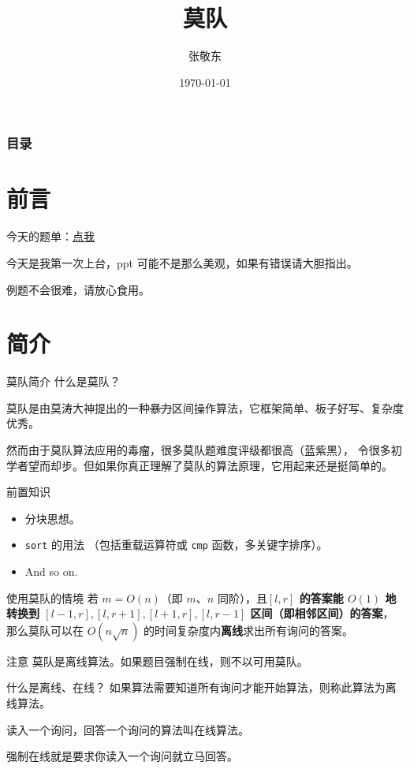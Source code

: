 \documentclass[table]{beamer}
\title{莫队}
\author{张敬东}
\date{\today}
\begin{document}
\frame{\titlepage} %

\begin{frame} %
	\frametitle{目录}
	\tableofcontents
\end{frame}

\section{前言}
\begin{frame}
	今天的题单：{\color{blue}\href{https://www.luogu.com.cn/training/428639}{点我}}

	今天是我第一次上台，ppt 可能不是那么美观，如果有错误请大胆指出。

	例题不会很难，请放心食用。
\end{frame}

\section{简介}

\begin{frame}[fragile]{莫队简介}
	什么是莫队？

	莫队是由莫涛大神提出的一种\sout{暴力}区间操作算法，它框架简单、板子好写、复杂度优秀。

	然而由于莫队算法应用的毒瘤，很多莫队题难度评级都很高（蓝紫黑），
	令很多初学者望而却步。但如果你真正理解了莫队的算法原理，它用起来还是挺简单的。
	\pause

	\begin{block}{前置知识}
		\begin{itemize}
			\item 分块思想。
			\item \verb|sort| 的用法
			（包括重载运算符或 \verb|cmp| 函数，多关键字排序）。
			\item And so on.
		\end{itemize}
	\end{block}
\end{frame}

\begin{frame}{使用莫队的情境}
	若 $m=O(n)$（即 $m$、$n$ 同阶），且\textbf{$[l,r]$ 的答案能 $O(1)$ 地转换到 
	$[l-1,r],[l,r+1],[l+1,r],[l,r-1]$ 区间（即相邻区间）的答案}，
	那么莫队可以在 $O(n\sqrt{n})$ 的时间复杂度内\textbf{离线}求出所有询问的答案。
	\pause

	\begin{alertblock}{注意}
		莫队是离线算法。如果题目强制在线，则不以可用莫队。
	\end{alertblock}

	\begin{block}{什么是离线、在线？}
		如果算法需要知道所有询问才能开始算法，则称此算法为离线算法。

		读入一个询问，回答一个询问的算法叫在线算法。

		强制在线就是要求你读入一个询问就立马回答。
	\end{block}
\end{frame}
\end{document}
